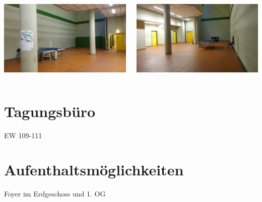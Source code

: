 \documentclass[compress,]{beamer}
\begin{document}
\begin{frame}
  \begin{columns}[onlytextwidth]
    \begin{column}{0.5\textwidth}
      \includegraphics[width=\textwidth]{images/bunker1.JPG}
    \end{column}
    \begin{column}{0.5\textwidth}
      \includegraphics[width=\textwidth]{images/bunker2.JPG}
    \end{column}
  \end{columns}
\end{frame}


\section{Tagungsbüro}
\begin{frame}{EW 109-111}
\end{frame}


\section{Aufenthaltsmöglichkeiten}
\begin{frame}{Foyer im Erdgeschoss und 1. OG}
\end{frame}
\end{document}
